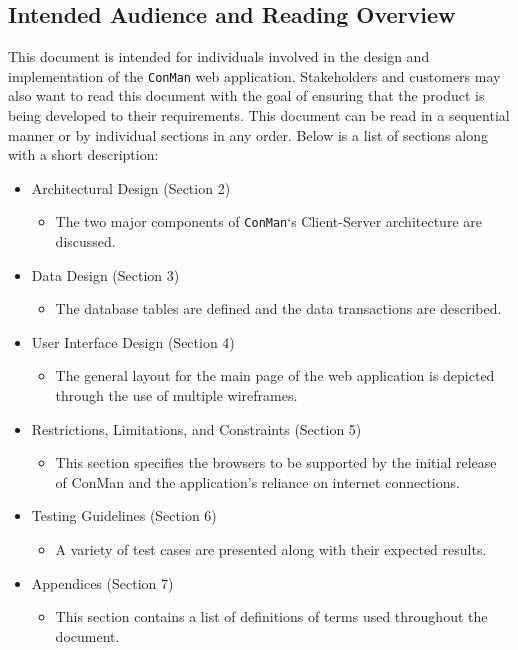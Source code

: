 \documentclass{article}
\begin{document}
\subsection{Intended Audience and Reading Overview}
This document is intended for individuals involved in the design and implementation of the \texttt{ConMan} web application. Stakeholders and customers may also want to read this document with the goal of ensuring that the product is being developed to their requirements. This document can be read in a sequential manner or by individual sections in any order. Below is a list of sections along with a short description:
\begin{itemize}
\item Architectural Design (Section 2)
\begin{itemize}
\item The two major components of \texttt{ConMan}`s Client-Server architecture are discussed.
\end{itemize}
\item Data Design (Section 3)
\begin{itemize}
\item The database tables are defined and the data transactions are described.
\end{itemize}
\item User Interface Design (Section 4)
\begin{itemize}
\item The general layout for the main page of the web application is depicted through the use of multiple wireframes.
\end{itemize}
\item Restrictions, Limitations, and Constraints (Section 5)
\begin{itemize}
\item This section specifies the browsers to be supported by the initial release of ConMan and the application's reliance on internet connections.
\end{itemize}
\item Testing Guidelines (Section 6)
\begin{itemize}
\item A variety of test cases are presented along with their expected results. 
\end{itemize}
\item Appendices (Section 7)
\begin{itemize}
\item This section contains a list of definitions of terms used throughout the document.
\end{itemize}
\end{itemize}
\newpage
\end{document}
